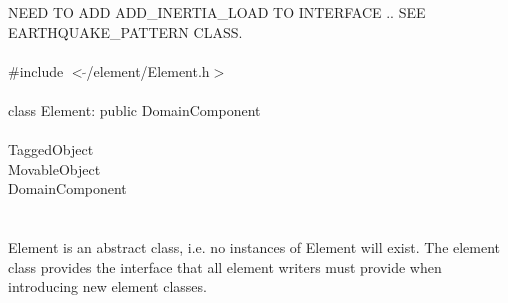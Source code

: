 
NEED TO ADD ADD\_INERTIA\_LOAD TO INTERFACE .. SEE EARTHQUAKE\_PATTERN
CLASS.\\

   \\
\indent \#include $<\tilde{ }$/element/Element.h$>$  \\

  \\
\indent class Element: public DomainComponent \\

 \\
\indent TaggedObject \\
\indent MovableObject \\
\indent\indent DomainComponent \\
\indent\indent{} \\

  \\
\indent Element is an abstract class, i.e. no instances of Element
will exist. The element class provides the interface that all element
writers must provide when introducing new element classes. \\


